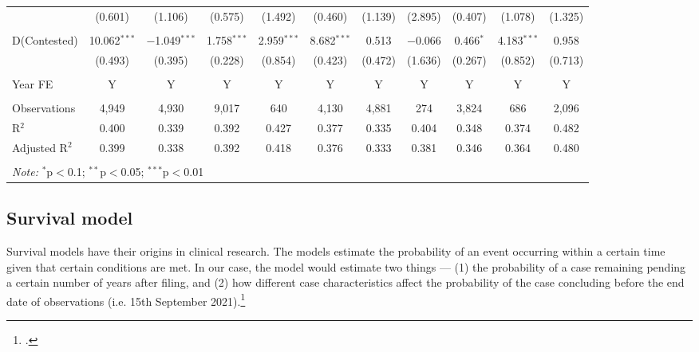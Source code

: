 \documentclass[12pt,a4paper]{article}
\begin{document}
\begin{appendices}
\begin{landscape}
\begin{table}
{\begin{tabular}{lcccccccccc}
 & (0.601) & (1.106) & (0.575) & (1.492) & (0.460) & (1.139) & (2.895) & (0.407) & (1.078) & (1.325) \\ 
 & & & & & & & & & & \\ 
 D(Contested) & 10.062$^{***}$ & $-$1.049$^{***}$ & 1.758$^{***}$ & 2.959$^{***}$ & 8.682$^{***}$ & 0.513 & $-$0.066 & 0.466$^{*}$ & 4.183$^{***}$ & 0.958 \\ 
 & (0.493) & (0.395) & (0.228) & (0.854) & (0.423) & (0.472) & (1.636) & (0.267) & (0.852) & (0.713) \\ 
 \hline \\[-1.8ex]
 Year FE & Y & Y & Y & Y & Y & Y & Y & Y & Y & Y \\
 \hline \\[-1.8ex] 
 Observations & 4,949 & 4,930 & 9,017 & 640 & 4,130 & 4,881 & 274 & 3,824 & 686 & 2,096 \\ 
 R$^{2}$ & 0.400 & 0.339 & 0.392 & 0.427 & 0.377 & 0.335 & 0.404 & 0.348 & 0.374 & 0.482 \\ 
 Adjusted R$^{2}$ & 0.399 & 0.338 & 0.392 & 0.418 & 0.376 & 0.333 & 0.381 & 0.346 & 0.364 & 0.480 \\ 
 \hline \\[-1.8ex] 
 \multicolumn{11}{l}{\textit{Note:} $^{*}$p$<$0.1; $^{**}$p$<$0.05; $^{***}$p$<$0.01} \\ 
 \end{tabular} }
 \end{table}
 \end{landscape}
 
 \subsection{Survival model}
 \label{sec:survivalModel}
 Survival models have their origins in clinical research. The models estimate the probability of an event occurring within a certain time given that certain conditions are met. In our case, the model would estimate two things --- (1) the probability of a case remaining pending a certain number of years after filing, and (2) how different case characteristics affect the probability of the case concluding before the end date of observations (i.e. 15th September 2021).\footcite[For a prior example of the use of hazard models for empirical judicial analysis, see][]{datta2017_itatDelays}
 

\end{appendices}
\end{document}
